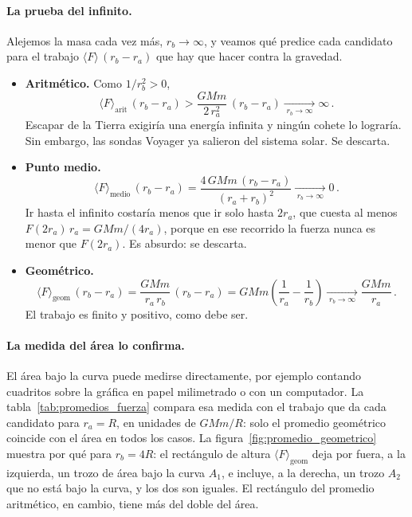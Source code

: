 \paragraph{La prueba del infinito.}
Alejemos la masa cada vez más, $r_{b} \to \infty$, y veamos qué predice cada
candidato para el trabajo $\langle F\rangle\,(r_{b} - r_{a})$ que hay que
hacer contra la gravedad.
\begin{itemize}
  \item \textbf{Aritmético.} Como $1/r_{b}^{2} > 0$,
    \begin{equation*}
      \langle F\rangle_{\text{arit}}\,(r_{b} - r_{a})
      > \frac{GMm}{2\,r_{a}^{2}}\,(r_{b} - r_{a})
      \xrightarrow[\;r_{b}\to\infty\;]{} \infty \,.
    \end{equation*}
    Escapar de la Tierra exigiría una energía infinita y ningún cohete lo
    lograría. Sin embargo, las sondas Voyager ya salieron del sistema solar.
    Se descarta.
  \item \textbf{Punto medio.}
    \begin{equation*}
      \langle F\rangle_{\text{medio}}\,(r_{b} - r_{a})
      = \frac{4\,GMm\,(r_{b} - r_{a})}{(r_{a} + r_{b})^{2}}
      \xrightarrow[\;r_{b}\to\infty\;]{} 0 \,.
    \end{equation*}
    Ir hasta el infinito costaría menos que ir solo hasta $2r_{a}$, que cuesta
    al menos $F(2r_{a})\,r_{a} = GMm/(4r_{a})$, porque en ese recorrido la
    fuerza nunca es menor que $F(2r_{a})$. Es absurdo: se descarta.
  \item \textbf{Geométrico.}
    \begin{equation*}
      \langle F\rangle_{\text{geom}}\,(r_{b} - r_{a})
      = \frac{GMm}{r_{a}\,r_{b}}\,(r_{b} - r_{a})
      = GMm\left(\frac{1}{r_{a}} - \frac{1}{r_{b}}\right)
      \xrightarrow[\;r_{b}\to\infty\;]{} \frac{GMm}{r_{a}} \,.
    \end{equation*}
    El trabajo es finito y positivo, como debe ser.
\end{itemize}

\paragraph{La medida del área lo confirma.}
El área bajo la curva puede medirse directamente, por ejemplo contando
cuadritos sobre la gráfica en papel milimetrado o con un computador. La
tabla~\ref{tab:promedios_fuerza} compara esa medida con el trabajo que da cada
candidato para $r_{a} = R$, en unidades de $GMm/R$: solo el promedio
geométrico coincide con el área en todos los casos. La
figura~\ref{fig:promedio_geometrico} muestra por qué para $r_{b} = 4R$: el
rectángulo de altura $\langle F\rangle_{\text{geom}}$ deja por fuera, a la
izquierda, un trozo de área bajo la curva $A_{1}$, e incluye, a la derecha, un
trozo $A_{2}$ que no está bajo la curva, y los dos son iguales. El rectángulo
del promedio aritmético, en cambio, tiene más del doble del área.

